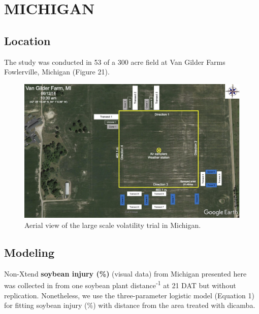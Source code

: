 \documentclass[]{article}
\begin{document}
\newpage

\pagebreak

\section{MICHIGAN}\label{michigan-1}

\subsection{Location}\label{location-2}

The study was conducted in 53 of a 300 acre field at Van Gilder Farms
Fowlerville, Michigan (Figure 21).

\begin{figure}[h]

{\centering \includegraphics[width=1\linewidth]{Michigan} 

}

\caption{Aerial view of the large scale volatility trial in Michigan.}\label{fig:unnamed-chunk-44}
\end{figure}

\newpage

\pagebreak

\subsection{Modeling}\label{modeling-2}

Non-Xtend \textbf{soybean injury (\%)} (visual data) from Michigan
presented here was collected in from one soybean plant
distance\textsuperscript{-1} at 21 DAT but without replication.
Nonetheless, we use the three-parameter logistic model (Equation 1) for
fitting soybean injury (\%) with distance from the area treated with
dicamba.
\end{document}

